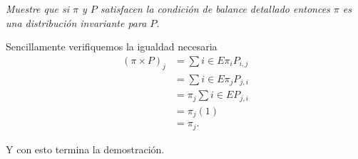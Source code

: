\emph{
    Muestre que si $\pi$ y $P$ satisfacen la condición de balance detallado entonces $\pi$ es una
    distribución invariante para $P$.
}

\afterstatement\pn

Sencillamente verifiquemos la igualdad necesaria
\begin{align}
    (\pi \times P)_{j}  &= \sum{i \in E} \pi_{i}P_{i,j}     \\
                        &= \sum{i \in E} \pi_{j}P_{j,i}     \\
                        &= \pi_{j} \sum{i \in E} P_{j,i}    \\
                        &= \pi_{j} (1)                      \\
                        &= \pi_{j}.
\end{align}

Y con esto termina la demostración.
